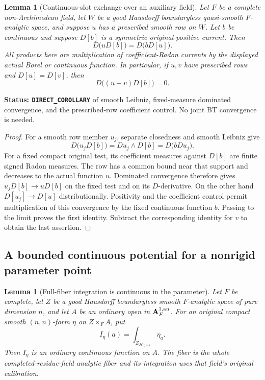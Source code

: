 \documentclass[11pt,a4paper]{article}
\numberwithin{equation}{section}
\newtheorem{lemma}[theorem]{Lemma}
\theoremstyle{definition}
\theoremstyle{remark}
\begin{document}
\begin{lemma}[Continuous-slot exchange over an auxiliary field]
\label{lem:r5-prescribed-continuous-exchange}
Let $F$ be a complete non-Archimedean field, let $W$ be a good
Hausdorff boundaryless quasi-smooth $F$-analytic space, and suppose
$u$ has a prescribed smooth row on $W$.  Let $b$ be continuous and
suppose $D[b]$ is a symmetric original-positive current.  Then
\[
 D\bigl(uD[b]\bigr)=D\bigl(bD[u]\bigr).
\]
All products here are multiplication of coefficient-Radon currents
by the displayed actual Borel or continuous function.  In particular,
if $u,v$ have prescribed rows and $D[u]=D[v]$, then
\[
 D\bigl((u-v)D[b]\bigr)=0.
\]
\end{lemma}

\noindent\textbf{Status: \texttt{DIRECT\_COROLLARY}} of smooth
Leibniz, fixed-measure dominated convergence, and the prescribed-row
coefficient control.  No joint BT convergence is needed.

\begin{proof}
For a smooth row member $u_j$, separate closedness and smooth
Leibniz give
\[
 D\bigl(u_jD[b]\bigr)=Du_j\wedge D[b]
                    =D\bigl(bDu_j\bigr).
\]
For a fixed compact original test, its coefficient measures against
$D[b]$ are finite signed Radon measures.  The row has a common bound
near that support and decreases to the actual function $u$.
Dominated convergence therefore gives $u_jD[b]\to uD[b]$ on the
fixed test and on its $D$-derivative.  On the other hand
$D[u_j]\to D[u]$ distributionally.  Positivity and the coefficient
control permit multiplication of this convergence by the fixed
continuous function $b$.  Passing to the limit proves the first
identity.  Subtract the corresponding identity for $v$ to obtain
the last assertion.
\end{proof}

\subsection{A bounded continuous potential for a nonrigid parameter point}

\begin{lemma}[Full-fiber integration is continuous in the parameter]
\label{lem:r5-continuous-full-fiber-integral}
Let $F$ be complete, let $Z$ be a good Hausdorff boundaryless smooth
$F$-analytic space of pure dimension $n$, and let $A$ be an ordinary
open in $\mathbf A_F^{1,\rm an}$.  For an original compact smooth
$(n,n)$-form $\eta$ on $Z\times_F A$, put
\[
 I_\eta(a)=\int_{Z_{\mathscr H(a)}}\eta_a.
\]
Then $I_\eta$ is an ordinary continuous function on $A$.  The fiber
is the whole completed-residue-field analytic fiber and its
integration uses that field's original calibration.
\end{lemma}
\end{document}
